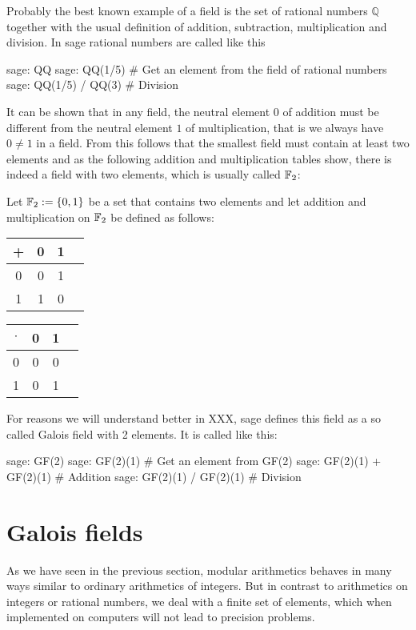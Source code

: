 \begin{example} Probably the best known example of a field is the set of rational numbers $\mathbb{Q}$ together with the usual definition of addition, subtraction, multiplication and division. In sage rational numbers are called like this
\begin{sagecommandline}
sage: QQ
sage: QQ(1/5) # Get an element from the field of rational numbers
sage: QQ(1/5) / QQ(3) # Division
\end{sagecommandline}
\end{example}
\begin{example} It can be shown that in any field, the neutral element $0$ of addition must be different from the neutral element $1$ of multiplication, that is we always have $0\neq 1$ in a field. From this follows that the smallest field must contain at least two elements and as the following addition and multiplication tables show, there is indeed a field with two elements, which is usually called $\mathbb{F}_2$:

Let $\mathbb{F}_2:=\{0,1 \}$ be a set that contains two elements and let addition and multiplication on $\mathbb{F}_2$ be defined as follows:
\begin{center}
  \begin{tabular}{c | c c c}
    + & 0 & 1 \\\hline
    0 & 0 & 1\\
    1 & 1 & 0 \\
  \end{tabular} \quad \quad \quad \quad
  \begin{tabular}{c | c c c}
$\cdot$ & 0 & 1 \\\hline
      0 & 0 & 0 \\
      1 & 0 & 1 \\
  \end{tabular}
\end{center}
For reasons we will understand better in XXX, sage defines this field as a so called Galois field with 2 elements. It is called like this:
\begin{sagecommandline}
sage: GF(2)
sage: GF(2)(1) # Get an element from GF(2)
sage: GF(2)(1) + GF(2)(1) # Addition
sage: GF(2)(1) / GF(2)(1) # Division
\end{sagecommandline}
\end{example}

\section{Galois fields}
As we have seen in the previous section, modular arithmetics behaves in many ways similar to ordinary arithmetics of integers. But in contrast to arithmetics on integers or rational numbers, we deal with a finite set of elements, which when implemented on computers will not lead to precision problems.

